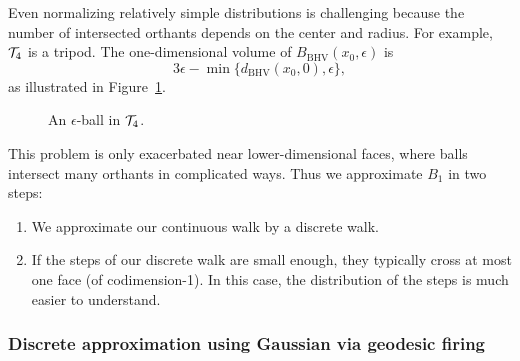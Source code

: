Even normalizing relatively simple distributions is challenging because the
number of intersected orthants depends on the center and radius. For example,
${\mathcal T}_4$ is a tripod. The one-dimensional volume of
$B_{\mathrm{BHV}}(x_0,\epsilon)$ is
\[
  3\epsilon-\min\{d_{\mathrm{BHV}}(x_0,0),\epsilon\},
\]
as illustrated in Figure~\ref{fig:balls_in_BHV4}.


\begin{figure}[h]
    \centering

    \caption{An $\epsilon$-ball in ${\mathcal T}_4$.}
    \label{fig:balls_in_BHV4}
\end{figure}


This problem is only exacerbated near lower-dimensional faces, where balls intersect many orthants in complicated ways. Thus we approximate $B_1$ in two steps:

\begin{enumerate}
    \item We approximate our continuous walk by a discrete walk.

    \item If the steps of our discrete walk are small enough, they typically cross at most one face (of codimension-1). In this case, the distribution of the steps is much easier to understand.
\end{enumerate}


\subsubsection{Discrete approximation using Gaussian via geodesic firing}

